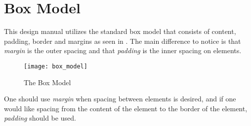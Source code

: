 \chapter{Box Model}
\label{cha:box_model}

This design manual utilizes the standard box model that consists of content, padding, border and margins as seen in . The main difference to notice is that \emph{margin} is the outer spacing and that \emph{padding} is the inner spacing on elements. 

\begin{figure}[h]
	\centering
	\texttt{[image: box\_model]}
	\caption{The Box Model}
	\label{fig:box_model}
\end{figure}

One should use \emph{margin} when spacing between elements is desired, and if one would like spacing from the content of the element to the border of the element, \emph{padding} should be used.

